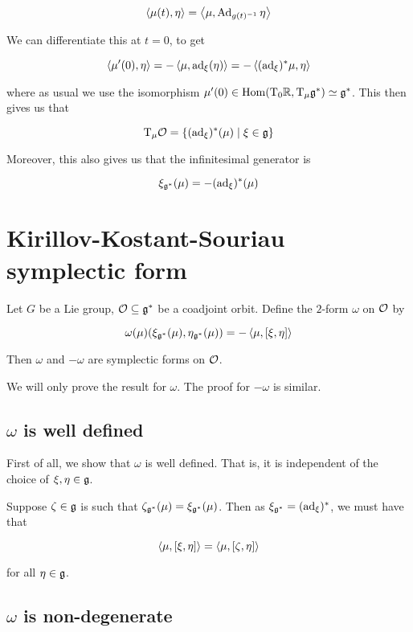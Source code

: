 \documentclass{article}
\begin{document}
\[\left\langle \mu(t), \eta \right\rangle = \left\langle \mu, \operatorname{Ad}_{g(t)^{-1}}\eta \right\rangle\]

We can differentiate this at \(t = 0\), to get

\[\left\langle \mu'(0), \eta \right\rangle = -\left\langle \mu, \operatorname{ad}_\xi(\eta) \right\rangle = -\left\langle (\operatorname{ad}_\xi)^*\mu, \eta \right\rangle\]

where as usual we use the isomorphism \(\mu'(0) \in \operatorname{Hom}(\mathrm{T}_0\mathbb{R}, \mathrm{T}_\mu\mathfrak{g}^*) \simeq \mathfrak{g}^*\). This then gives us that

\[\mathrm{T}_\mu\mathcal{O} = \left\{(\operatorname{ad}_\xi)^*(\mu) \mid \xi \in \mathfrak{g}\right\}\]

Moreover, this also gives us that the infinitesimal generator is

\[\xi_{\mathfrak{g}^*}(\mu) = -(\operatorname{ad}_\xi)^*(\mu)\]

\section{Kirillov-Kostant-Souriau symplectic form}

\begin{theorem}
    Let \(G\) be a Lie group, \(\mathcal{O} \subseteq \mathfrak{g}^*\) be a coadjoint orbit. Define the \(2\)-form \(\omega\) on \(\mathcal{O}\) by

    \[\omega(\mu)(\xi_{\mathfrak{g}^*}(\mu), \eta_{\mathfrak{g}^*}(\mu)) = -\left\langle \mu, [\xi, \eta] \right\rangle\]

    Then \(\omega\) and \(-\omega\) are symplectic forms on \(\mathcal{O}\).
\end{theorem}

We will only prove the result for \(\omega\). The proof for \(-\omega\) is similar.

\subsection{\(\omega\) is well defined}

First of all, we show that \(\omega\) is well defined. That is, it is independent of the choice of \(\xi, \eta \in \mathfrak{g}\).

Suppose \(\zeta \in \mathfrak{g}\) is such that \(\zeta_{\mathfrak{g}^*}(\mu) = \xi_{\mathfrak{g}^*}(\mu)\). Then as \(\xi_{\mathfrak{g}^*} = (\operatorname{ad}_\xi)^*\), we must have that

\[\left\langle \mu, [\xi, \eta] \right\rangle = \left\langle \mu, [\zeta, \eta] \right\rangle\]

for all \(\eta \in \mathfrak{g}\).

\subsection{\(\omega\) is non-degenerate}
\end{document}
